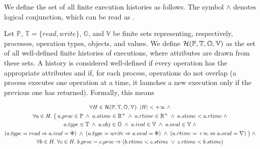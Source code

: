 \documentclass[12pt]{article}
\begin{document}
We define the set of all finite execution histories as follows. The symbol $\land$ denotes logical conjunction, which can be read as .

\begin{nameddefinition}
Let $\mathbb{P}$, $\mathbb{T} = \{read,write\}$, $\mathbb{O}$, and $\mathbb{V}$ be finite sets representing, respectively, processes, operation types, objects, and values. We define $\mathcal{H}(\mathbb{P}, \mathbb{T}, \mathbb{O}, \mathbb{V})$ as the set of all well-defined finite histories of executions, where attributes are drawn from these sets. A history is considered well-defined if every operation has the appropriate attributes and if, for each process, operations do not overlap (a process executes one operation at a time, it launches a new execution only if the previous one has returned). Formally, this means

\begin{gather*}
\forall H\in\mathcal{H}(\mathbb{P}, \mathbb{T}, \mathbb{O}, \mathbb{V}).\;|H|<+\infty \;\land \\
\forall a\in H.\;\big(\;a.proc\in\mathbb{P}\;\land\;a.stime\in\mathbb{R}^+\;\land\;a.rtime\in\mathbb{R}^+\;\land\;a.stime<a.rtime \;\land \\
a.type\in\mathbb{T}\;\land\;a.obj\in\mathbb{O}\;\land\;a.ival\in\mathbb{V}\;\land\;a.oval\in\mathbb{V}\;\land\\
(a.type=read\Rightarrow a.ival=\Phi)\;\land\;(a.type=write\Rightarrow a.oval=\Phi)\;\land\;(a.rtime=+\infty\Leftrightarrow a.oval=\nabla)
\;\big)\;\land \\
\forall b\in H.\;\forall c\in H.\; b.proc=c.proc\Rightarrow( b.rtime<c.stime\;\lor\;c.rtime<b.stime )
\end{gather*}
\end{nameddefinition}
\end{document}
